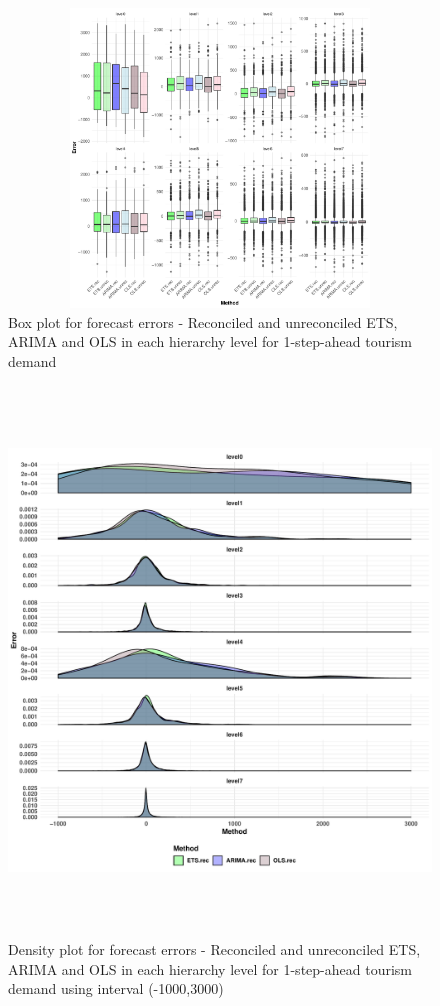 \documentclass[11pt,a4paper,]{article}
\begin{document}
\begin{figure}

{\centering \includegraphics[width=450px,height=300px]{Paper-Figures/results_Tourism/boxplot_1} 

}

\caption{Box plot for forecast errors -  Reconciled and unreconciled ETS, ARIMA and OLS in each hierarchy level for 1-step-ahead tourism demand}\label{fig:boxplotrollingtourism}
\end{figure}

\begin{figure}

{\centering \includegraphics[width=450px,height=550px]{Paper-Figures/results_Tourism/densityplot_1} 

}

\caption{Density plot for forecast errors -  Reconciled and unreconciled ETS, ARIMA and OLS in each hierarchy level for 1-step-ahead tourism demand using interval (-1000,3000)}\label{fig:densityplotrollingtourism}
\end{figure}
\end{document}
